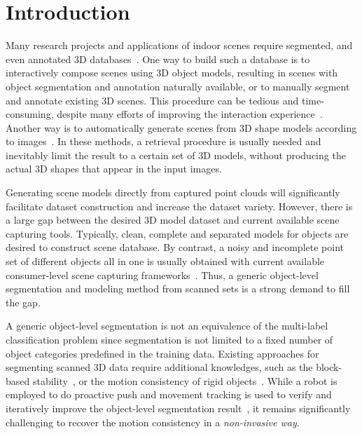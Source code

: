 \section{Introduction}
\label{sec:intro}
Many research projects and applications of indoor scenes require segmented, and even annotated 3D databases~\cite{SearchClassify,SceneFromExample,Fisher:2012:ESO:2366145.2366154,Chen:2014:ASM:2661229.2661239,Fisher:ActivityCentricSceneSynthesis}.
One way to build such a database is to interactively compose scenes using 3D object models, resulting in scenes with object segmentation and annotation naturally available, or to manually segment and annotate existing 3D scenes. This procedure can be tedious and time-consuming, despite many efforts of improving the interaction experience~\cite{Merrell:2011:IFL:2010324.1964982, Xu:2013:SSC:2461912.2461968}. Another way is to automatically generate scenes from 3D shape models according to images~\cite{Liu2015Model,Chen:2014:ASM:2661229.2661239}. In these methods, a retrieval procedure is usually needed and inevitably limit the result to a certain set of 3D models, without producing the actual 3D shapes that appear in the input images.

Generating scene models directly from captured point clouds will significantly facilitate dataset construction and increase the dataset variety. However, there is a large gap between the desired 3D model dataset and current available scene capturing tools. Typically, clean, complete and separated models for objects are desired to construct scene database. By contrast, a noisy and incomplete point set of different objects all in one is usually obtained with current available consumer-level scene capturing frameworks~\cite{KinectFusion, dai2016bundlefusion}. Thus, a generic object-level segmentation and modeling method from scanned sets is a strong demand to fill the gap.

A generic object-level segmentation is not an equivalence of the multi-label classification problem since segmentation is not limited to a fixed number of object categories predefined in the training data. 
Existing approaches for segmenting scanned 3D data require additional knowledges, such as the block-based stability~\cite{3DReasoningfromBlockstoStability}, or the motion consistency of rigid objects~\cite{Xu:2015:ACS:2816795.2818075}. 
While a robot is employed to do proactive push and movement tracking is used to verify and iteratively improve the object-level segmentation result~\cite{Xu:2015:ACS:2816795.2818075}, it remains significantly challenging to recover the motion consistency in a \emph{non-invasive way}. 
%

